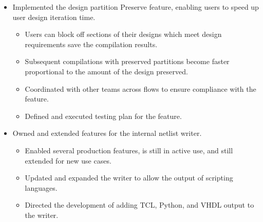 \documentclass[12pt]{article}
\begin{document}
\begin{small}
\begin{itemize}
            \item {Implemented the design partition Preserve feature, enabling users to speed up user design iteration time.}
                \begin{itemize}[label=$\circ$,topsep=-5px,partopsep=0px]
                    \itemsep0em 
                    \item {Users can block off sections of their designs which meet design requirements save the compilation results.}
                    \item {Subsequent compilations with preserved partitions become faster proportional to the amount of the design preserved.}
                    \item {Coordinated with other teams across flows to ensure compliance with the feature.}
                    \item {Defined and executed testing plan for the feature.}
                \end{itemize}


            \item {Owned and extended features for the internal netlist writer.}
                \begin{itemize}[label=$\circ$,topsep=-5px,partopsep=0px]
                    \itemsep0em 
                    \item {Enabled several production features, is still in active use, and still extended for new use cases.}
                    \item {Updated and expanded the writer to allow the output of scripting languages.}
                    \item {Directed the development of adding TCL, Python, and VHDL output to the writer.}
                \end{itemize}

        \end{itemize}
    \end{small}
\end{document}
